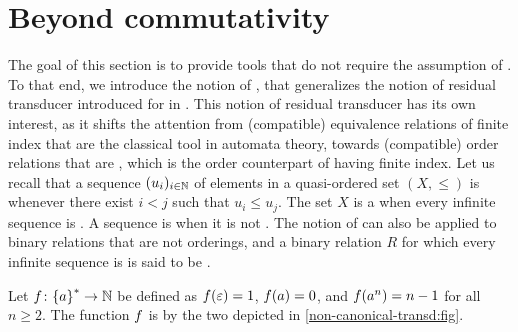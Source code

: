 \section{Beyond commutativity}
\label{beyond-commutative:sec}

\AP The goal of this section is to provide tools that do not require the
assumption of . To that end, we introduce the notion of
, that generalizes the notion of residual
transducer introduced for  in \cite{CDTL23}.
This notion of residual transducer has its own interest, as it shifts the
attention from (compatible) equivalence relations of finite index that are the
classical tool in automata theory, towards (compatible) order relations that
are , which is the order counterpart of having finite
index. Let us recall that a sequence $(u_i)_{i \in \mathbb{N}}$ of elements in a
quasi-ordered set $(X, \leq)$ is  whenever there exist $i < j$ such
that $u_i \leq u_j$. The set $X$ is a  when every
infinite sequence is . A sequence is  when it is not
. The notion of  can also be applied to
binary relations that are not orderings, and a binary relation $R$ for which
every infinite sequence is  is said to be 
\cite{MELL98}.

\begin{example}
    \label{non-canonical-transd:ex}
    Let $\BadExOk \colon \set{a}^* \to \Nat$
    be defined as
    $\BadExOk(\varepsilon) = 1$,
    $\BadExOk(a) = 0$,
    and $\BadExOk(a^n) = n - 1$ for all $n \geq 2$.
    The function $\BadExOk$ is  by the two 
    depicted in \cref{non-canonical-transd:fig}.
\end{example}

